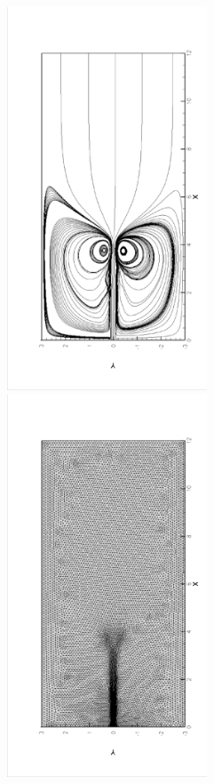 \documentclass[a4paper, 11pt]{article}
\begin{document}
       \begin{figure}[!htbp]
         \begin{center}
             \includegraphics[width = 0.53\textwidth, angle = -90]{picture/jet_flow_data/streamline_t12s.eps}
             \includegraphics[width = 0.53\textwidth, angle = -90]{picture/jet_flow_data/mesh_t12s.eps}

\end{center}
\end{figure}
\end{document}
